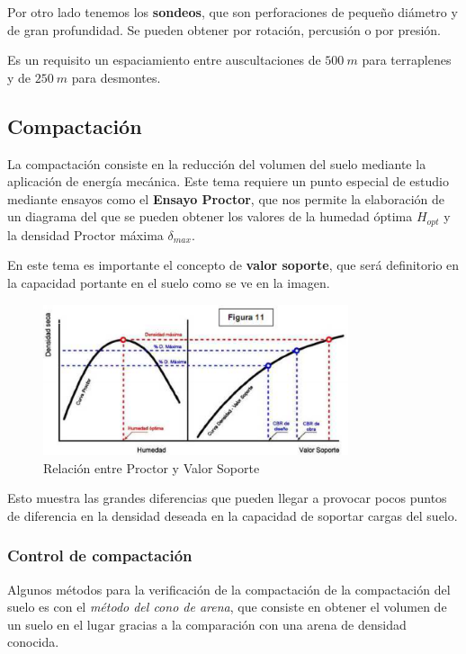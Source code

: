 \documentclass[../main.tex]{subfiles}
\begin{document}
Por otro lado tenemos los \textbf{sondeos}, que son perforaciones de pequeño
diámetro y de gran profundidad. Se pueden obtener por rotación, percusión o 
por presión.

Es un requisito un espaciamiento entre auscultaciones de $\SI{500}{m}$ para 
terraplenes y de $\SI{250}{m}$ para desmontes.

\subsection{Compactación}

La compactación consiste en la reducción del volumen del suelo mediante la aplicación
de energía mecánica. Este tema requiere un punto especial de estudio mediante
ensayos como el \textbf{Ensayo Proctor}, que nos permite la elaboración de un
diagrama del que se pueden obtener los valores de la humedad óptima $H_{opt}$
 y la densidad Proctor máxima $\delta_{max}$.

En este tema es importante el concepto de \textbf{valor soporte}, que será definitorio
en la capacidad portante en el suelo como se ve en la imagen.

\begin{figure}[ht]
  \centering
  \includegraphics[width=0.8\textwidth]{../images/20210422/valor_soporte}
  \caption{Relación entre Proctor y Valor Soporte}
  \label{fig:valor_soporte}
\end{figure}

Esto muestra las grandes diferencias que pueden llegar a provocar pocos puntos
de diferencia en la densidad deseada en la capacidad de soportar cargas del suelo.

\subsubsection{Control de compactación}

Algunos métodos para la verificación de la compactación de la compactación del
suelo es con el \textit{método del cono de arena}, que consiste en obtener el volumen
de un suelo en el lugar gracias a la comparación con una arena de densidad conocida.
\end{document}
